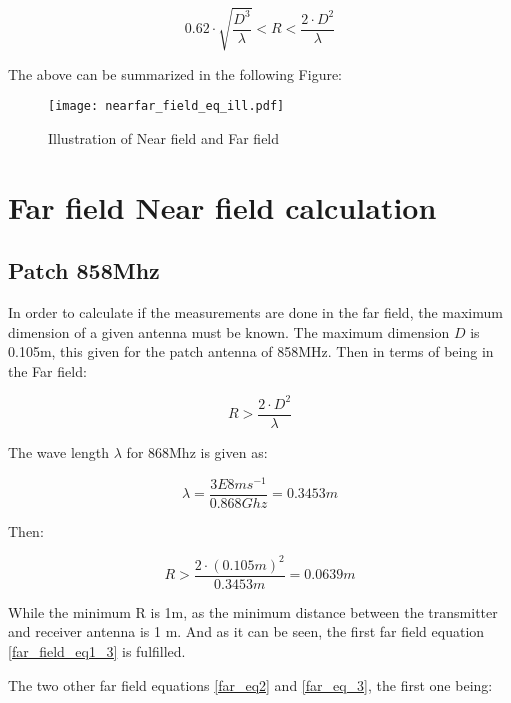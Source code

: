\begin{equation}
0.62 \cdot \sqrt{\frac{D^{3}}{\lambda}} < R < \frac{2 \cdot D^{2}}{\lambda}
\label{far_field_eq1_2}
\end{equation}


The above can be summarized in the following Figure:

\begin{figure}[H]
\centering
\texttt{[image: nearfar\_field\_eq\_ill.pdf]}
\caption{Illustration of Near field and Far field \citep{farnear_field1}}
\label{nearfarf_eq_ill}
\end{figure}


\section{Far field Near field calculation}

\subsection{Patch 858Mhz}

In order to calculate if the measurements are done in the far field, the maximum dimension of a given antenna must be known. The maximum dimension $D$ is 0.105m, this given for the patch antenna of 858MHz. Then in terms of being in the Far field:

\begin{equation}
R > \frac{2 \cdot D^{2}}{\lambda}
\label{far_field_eq1_3}
\end{equation}



The wave length $\lambda$ for 868Mhz is given as:

\begin{equation}
\lambda = \frac{3E8 ms^{-1}}{0.868 Ghz} = 0.3453m
\end{equation}

Then:

\begin{equation}
R> \frac{2 \cdot (0.105m)^{2}}{0.3453m} = 0.0639 m 
\end{equation} 

While the minimum R is 1m, as the minimum distance between the transmitter and receiver antenna is 1 m. And as it can be seen, the first far field equation \eqref{far_field_eq1_3} is fulfilled. 

The two other far field equations \eqref{far_eq2} and \eqref{far_eq_3}, the first one being:

